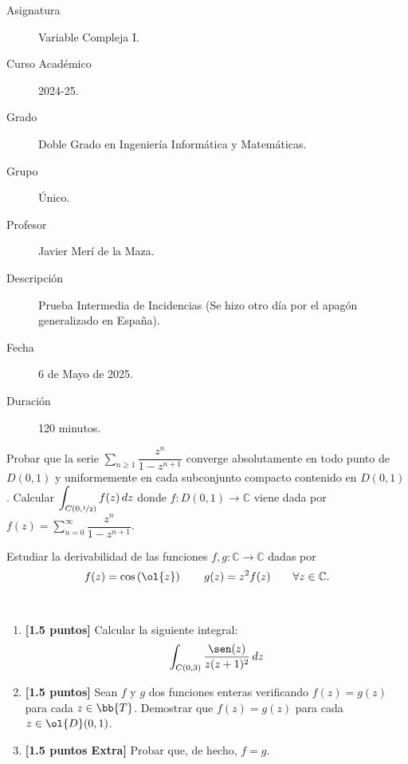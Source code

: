 \documentclass[12pt]{article}
\begin{document}

    
    

    \begin{description}
        \item[Asignatura] Variable Compleja I.
        \item[Curso Académico] 2024-25.
        \item[Grado] Doble Grado en Ingeniería Informática y Matemáticas.
        \item[Grupo] Único.
        \item[Profesor] Javier Merí de la Maza.
        \item[Descripción] Prueba Intermedia de Incidencias (Se hizo otro día por el apagón generalizado en España).
        \item[Fecha] 6 de Mayo de 2025.
        \item[Duración] 120 minutos.
    \end{description}
    \newpage

    \begin{ejercicio}[3.5 puntos]
        Probar que la serie $\displaystyle \sum\limits_{n\geq 1} \dfrac{z^n}{1-z^{n+1}}$ converge absolutamente en todo punto de $D(0, 1)$ y uniformemente en cada subconjunto compacto contenido en $D(0, 1)$. Calcular $\displaystyle \int_{C(0,\nicefrac{1}{2})} f(z) \, dz$ donde $f:D(0, 1) \to \mathbb{C}$ viene dada por $f(z) = \sum\limits_{n=0}^{\infty} \dfrac{z^n}{1-z^{n+1}}$.
    \end{ejercicio}

    \begin{ejercicio}[3.5 puntos]
        Estudiar la derivabilidad de las funciones $f , g : \mathbb{C} \to \mathbb{C}$ dadas por
        \[
            f(z) = \cos\left(\ol{z}\right)\qquad g(z) = z^2f(z)\qquad \forall z \in \mathbb{C}.
        \]
    \end{ejercicio}

    \begin{ejercicio}~
        \begin{enumerate}
            \item \textbf{[1.5 puntos]} Calcular la siguiente integral:
            \begin{equation*}
                \int_{C(0,3)} \frac{\sen(z)}{z(z+1)^2} \, dz
            \end{equation*}
            \item \textbf{[1.5 puntos]} Sean $f$ y $g$ dos funciones enteras verificando $f(z) = g(z)$ para cada $z \in \bb{T}$. Demostrar que $f(z) = g(z)$ para cada $z \in \ol{D}(0, 1)$. 
            \item \textbf{[1.5 puntos Extra]} Probar que, de hecho, $f = g$.
        \end{enumerate}
    \end{ejercicio}
\end{document}
